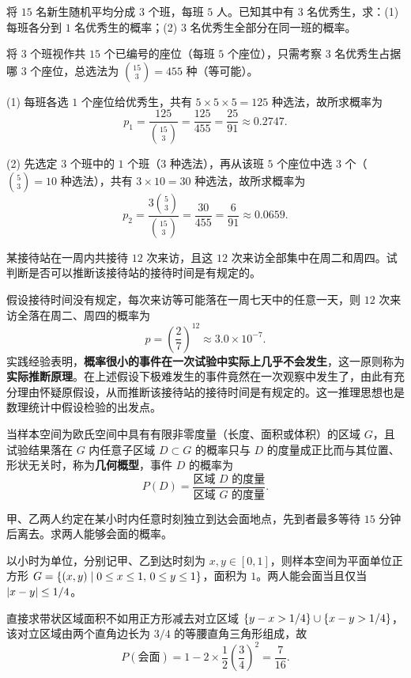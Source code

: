 \begin{example}[title={等额分班问题}]
\label{eg:balanced-assignment}
将 $15$ 名新生随机平均分成 $3$ 个班，每班 $5$ 人。已知其中有 $3$ 名优秀生，求：(1) 每班各分到 $1$ 名优秀生的概率；(2) $3$ 名优秀生全部分在同一班的概率。
\begin{solution}
将 $3$ 个班视作共 $15$ 个已编号的座位（每班 $5$ 个座位），只需考察 $3$ 名优秀生占据哪 $3$ 个座位，总选法为 $\binom{15}{3}=455$ 种（等可能）。

(1) 每班各选 $1$ 个座位给优秀生，共有 $5\times 5\times 5=125$ 种选法，故所求概率为
\[
  p_1=\frac{125}{\binom{15}{3}}=\frac{125}{455}=\frac{25}{91}\approx 0.2747.
\]

(2) 先选定 $3$ 个班中的 $1$ 个班（$3$ 种选法），再从该班 $5$ 个座位中选 $3$ 个（$\binom{5}{3}=10$ 种选法），共有 $3\times 10=30$ 种选法，故所求概率为
\[
  p_2=\frac{3\binom{5}{3}}{\binom{15}{3}}=\frac{30}{455}=\frac{6}{91}\approx 0.0659.
\]
\end{solution}
\end{example}

\begin{example}[title={实际推断原理（小概率原理）}]
\label{rem:practical-inference}
某接待站在一周内共接待 $12$ 次来访，且这 $12$ 次来访全部集中在周二和周四。试判断是否可以推断该接待站的接待时间是有规定的。
\begin{solution}
假设接待时间没有规定，每次来访等可能落在一周七天中的任意一天，则 $12$ 次来访全落在周二、周四的概率为
\[
  p=\left(\frac{2}{7}\right)^{12}\approx 3.0\times 10^{-7}.
\]
实践经验表明，\textbf{概率很小的事件在一次试验中实际上几乎不会发生}，这一原则称为\textbf{实际推断原理}。在上述假设下极难发生的事件竟然在一次观察中发生了，由此有充分理由怀疑原假设，从而推断该接待站的接待时间是有规定的。这一推理思想也是数理统计中假设检验的出发点。
\end{solution}
\end{example}

\begin{remark}[几何概型]
当样本空间为欧氏空间中具有有限非零度量（长度、面积或体积）的区域 $G$，且试验结果落在 $G$ 内任意子区域 $D\subset G$ 的概率只与 $D$ 的度量成正比而与其位置、形状无关时，称为\textbf{几何概型}，事件 $D$ 的概率为
\[
  P(D)=\frac{\text{区域 }D\text{ 的度量}}{\text{区域 }G\text{ 的度量}}.
\]
\end{remark}

\begin{example}[title={会面问题}]
\label{eg:meeting-problem}
甲、乙两人约定在某小时内任意时刻独立到达会面地点，先到者最多等待 $15$ 分钟后离去。求两人能够会面的概率。
\begin{solution}
以小时为单位，分别记甲、乙到达时刻为 $x,y\in[0,1]$，则样本空间为平面单位正方形 $G=\{(x,y)\mid 0\le x\le 1,\,0\le y\le 1\}$，面积为 $1$。两人能会面当且仅当 $\lvert x-y\rvert\le 1/4$。

直接求带状区域面积不如用正方形减去对立区域 $\{y-x>1/4\}\cup\{x-y>1/4\}$，该对立区域由两个直角边长为 $3/4$ 的等腰直角三角形组成，故
\[
  P(\text{会面})=1-2\times\frac{1}{2}\left(\frac{3}{4}\right)^2=\frac{7}{16}.
\]
\end{solution}
\end{example}

